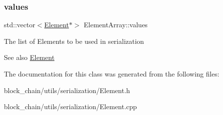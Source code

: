 \subsubsection{\texorpdfstring{values}{values}}
{\footnotesize\ttfamily std\+::vector$<$\mbox{\hyperlink{classElement}{Element}}$\ast$$>$ Element\+Array\+::values}

The list of Elements to be used in serialization \begin{DoxySeeAlso}{See also}
\mbox{\hyperlink{classElement}{Element}} 
\end{DoxySeeAlso}


The documentation for this class was generated from the following files\+:\begin{DoxyCompactItemize}
\item 
block\+\_\+chain/utils/serialization/Element.\+h\item 
block\+\_\+chain/utils/serialization/Element.\+cpp\end{DoxyCompactItemize}
